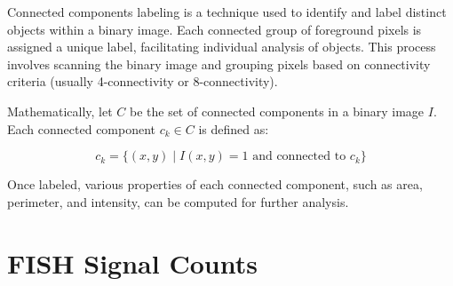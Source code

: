 \documentclass[a4paper,12pt]{article}
\begin{document}
Connected components labeling is a technique used to identify and label distinct objects within a binary image. Each connected group of foreground pixels is assigned a unique label, facilitating individual analysis of objects. This process involves scanning the binary image and grouping pixels based on connectivity criteria (usually 4-connectivity or 8-connectivity).

Mathematically, let \( C \) be the set of connected components in a binary image \( I \). Each connected component \( c_k \in C \) is defined as:

\[
c_k = \{ (x, y) \mid I(x, y) = 1 \text{ and connected to } c_k \}
\]

Once labeled, various properties of each connected component, such as area, perimeter, and intensity, can be computed for further analysis.

\section{FISH Signal Counts}



\end{document}
